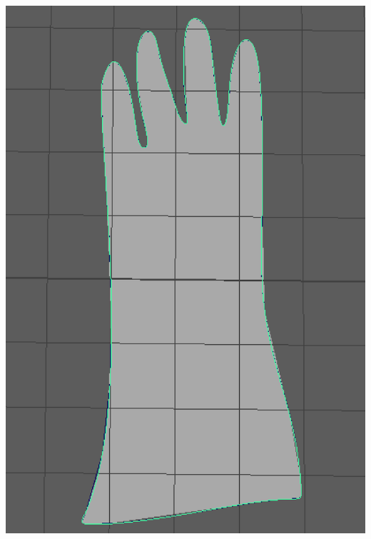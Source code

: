 \documentclass[ %
                    author={Elis Jones},
                supervisor={Dr. Kirsten Cater},
                    degree={BSc},
                     title={The Effect of Presentation Medium on Spatial Cognition},
                  subtitle={in the Virtual Environment},
                      year={2018} ]{dissertation}
\begin{document}
\begin{minipage}{\textwidth}
\begin{center}
\begin{minipage}{0.18\textwidth}
        \includegraphics[width=1\textwidth]{images/planar.png}
    \end{minipage}\hfill
    \begin{minipage}{0.18\textwidth}
        \centering

\end{minipage}
\end{center}
\end{minipage}
\end{document}

